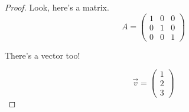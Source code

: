 \documentclass[12 pt]{article}
\theoremstyle{definition}
\newcommand\m[1]{\begin{pmatrix}#1\end{pmatrix}}
\begin{document}
\begin{proof}
Look, here's a matrix.
$$A = \m{1&0&0\\0&1&0\\0&0&1}$$

There's a vector too!

$$\vec{v} = \m{1\\2\\3}$$
\end{proof}

 
\end{document}
